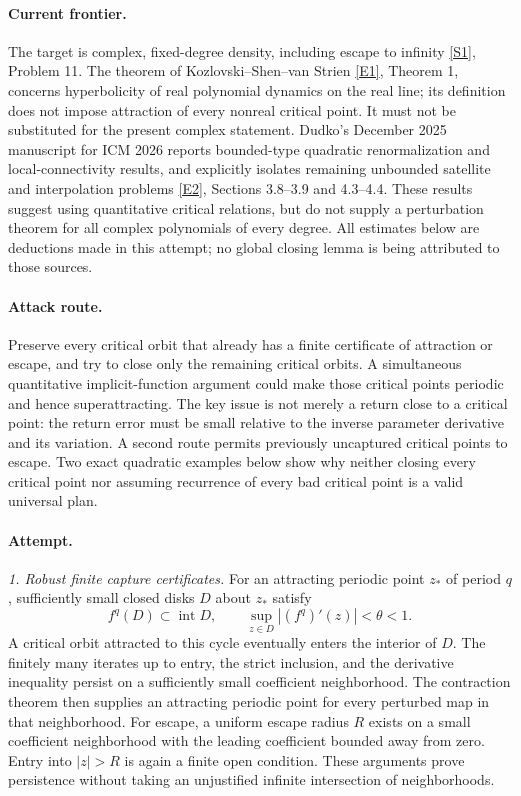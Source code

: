 \documentclass[11pt,a4paper]{article}
\newcommand{\sref}[2]{\hyperlink{source:#1:#2}{[S#2]}}
\newcommand{\eref}[2]{\hyperlink{extra:#1:#2}{[E#2]}}
\begin{document}
\paragraph{Current frontier.}
The target is complex, fixed-degree density, including escape to infinity
\sref{215}{1}, Problem 11. The theorem of Kozlovski--Shen--van Strien
\eref{215}{1}, Theorem 1, concerns hyperbolicity of real polynomial dynamics
on the real line; its definition does not impose attraction of every
nonreal critical point. It must not be substituted for the present
complex statement. Dudko's December 2025 manuscript for ICM 2026 reports
bounded-type quadratic renormalization and local-connectivity results,
and explicitly isolates remaining unbounded satellite and interpolation
problems \eref{215}{2}, Sections 3.8--3.9 and 4.3--4.4.
These results suggest using quantitative critical relations, but do not
supply a perturbation theorem for all complex polynomials of every degree.
All estimates below are deductions made in this attempt; no global closing
lemma is being attributed to those sources.

\paragraph{Attack route.}
Preserve every critical orbit that already has a finite certificate of
attraction or escape, and try to close only the remaining critical orbits.
A simultaneous quantitative implicit-function argument could make those
critical points periodic and hence superattracting. The key issue is not
merely a return close to a critical point: the return error must be small
relative to the inverse parameter derivative and its variation. A second
route permits previously uncaptured critical points to escape. Two exact
quadratic examples below show why neither closing every critical point nor
assuming recurrence of every bad critical point is a valid universal plan.

\paragraph{Attempt.}
\textit{1. Robust finite capture certificates.}
For an attracting periodic point $z_*$ of period $q$, sufficiently small
closed disks $D$ about $z_*$ satisfy
\[
 f^q(D)\subset\operatorname{int}D,
 \qquad \sup_{z\in D}|(f^q)'(z)|<\theta<1.                 \tag{215.1}
\]
A critical orbit attracted to this cycle eventually enters the interior
of $D$. The finitely many iterates up to entry, the strict inclusion, and
the derivative inequality persist on a sufficiently small coefficient
neighborhood. The contraction theorem then supplies an attracting
periodic point for every perturbed map in that neighborhood. For escape,
a uniform escape radius $R$ exists on a small coefficient neighborhood
with the leading coefficient bounded away from zero. Entry into
$|z|>R$ is again a finite open condition. These arguments prove persistence
without taking an unjustified infinite intersection of neighborhoods.
\end{document}
